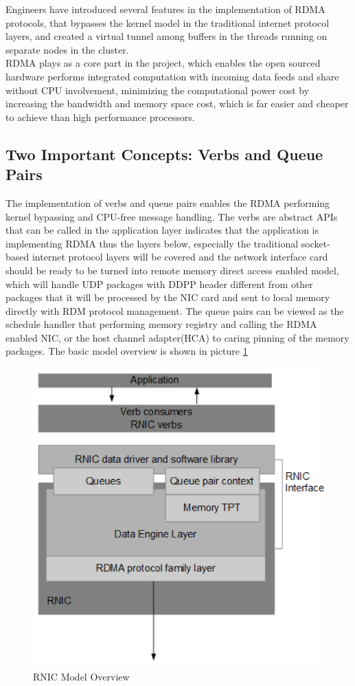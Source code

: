 \documentclass[11pt,openright,a4paper]{report}
\begin{document}
Engineers have introduced several features in the implementation of RDMA protocols, that bypasses the kernel model in the traditional internet protocol layers, and created a virtual tunnel among buffers in the threads running on separate nodes in the cluster.\\
RDMA plays as a core part in the project, which enables the open sourced hardware performs integrated computation with incoming data feeds and share without CPU involvement,  minimizing the computational power cost by increasing the bandwidth and memory space cost, which is far easier and cheaper to achieve than high performance processors.\\
\subsection{Two Important Concepts: Verbs and Queue Pairs}
The implementation of verbs and queue pairs enables the RDMA performing kernel bypassing and CPU-free message handling. The verbs are abstract APIs that can be called in the application layer indicates that the application is implementing RDMA thus the layers below, especially the traditional socket-based internet protocol layers will be covered and the network interface card should be ready to be turned into remote memory direct access enabled model,  which will handle UDP packages with DDPP header different from other packages that it will be processed by the NIC card and sent to local memory directly with RDM protocol management. The queue pairs can be viewed as the schedule handler that performing memory registry and calling the RDMA enabled NIC, or the host channel adapter(HCA) to caring pinning of the memory packages. The basic model overview is shown in picture \ref{fig:rnic}\\
\begin{figure}[H]
	\centering
    \includegraphics[width=0.4\linewidth]{picture/rnic.PNG}
    \caption{RNIC Model Overview}
    \label{fig:rnic}
\end{figure}
\end{document}

